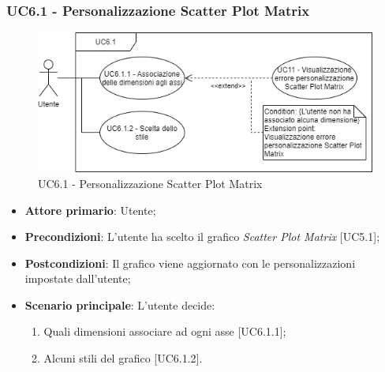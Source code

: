 \subsubsection{UC6.1 - Personalizzazione Scatter Plot Matrix}
\begin{figure}[h]
\includegraphics[width=\linewidth]{Section/Images/UC6.1.png}
\centering
\caption{UC6.1 - Personalizzazione Scatter Plot Matrix}
\end{figure}
\begin{itemize}
	\item \textbf{Attore primario}: Utente;
	
	\item \textbf{Precondizioni}: L'utente ha scelto il grafico \textit{Scatter Plot Matrix} [UC5.1];
	
	\item \textbf{Postcondizioni}: Il grafico viene aggiornato con le personalizzazioni impostate dall'utente;
	
	\item \textbf{Scenario principale}: L'utente decide:

\begin{enumerate}
\item Quali dimensioni associare ad ogni asse [UC6.1.1];
\item Alcuni stili del grafico [UC6.1.2].
\end{enumerate}	
	
		

\end{itemize}


